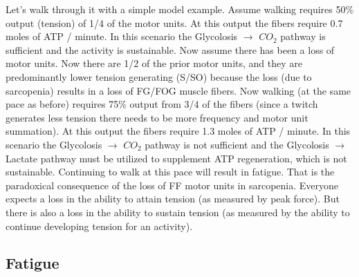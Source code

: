 Let's walk through it with a simple model example. Assume walking requires 50\% output (tension) of 1/4 of the motor units. At this output the fibers require 0.7 moles of ATP / minute. In this scenario the Glycolosis $\rightarrow$ $CO_2$ pathway is sufficient and the activity is sustainable. Now assume there has been a loss of motor units. Now there are 1/2 of the prior motor units, and they are predominantly lower tension generating (S/SO) because the loss (due to sarcopenia) results in a loss of FG/FOG muscle fibers. Now walking (at the same pace as before) requires 75\% output from 3/4 of the fibers (since a twitch generates less tension there needs to be more frequency and motor unit summation). At this output the fibers require 1.3 moles of ATP / minute. In this scenario the Glycolosis $\rightarrow$ $CO_2$ pathway is not sufficient and the Glycolosis $\rightarrow$ Lactate pathway must be utilized to supplement ATP regeneration, which is not sustainable. Continuing to walk at this pace will result in fatigue. That is the paradoxical consequence of the loss of FF motor units in sarcopenia. Everyone expects a loss in the ability to attain tension (as measured by peak force). But there is also a loss in the ability to sustain tension (as measured by the ability to continue developing tension for an activity).


\subsection{Fatigue}


